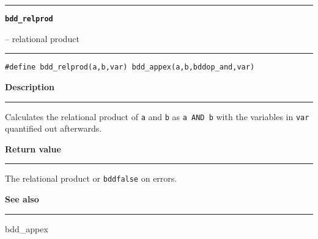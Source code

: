 \begin{minipage}{\textwidth}

\noindent\begin{minipage}{\textwidth}
\rule{\textwidth}{0.5mm}
{\tt\bf bdd\_relprod }
\--- relational product  \hspace{\fill}
\\\rule[1.5ex]{\textwidth}{0.5mm}
\end{minipage}

\noindent\begin{verbatim}
#define bdd_relprod(a,b,var) bdd_appex(a,b,bddop_and,var) 
\end{verbatim}

\vspace{\parsep}\noindent
{\bf Description}\\\rule[1.5ex]{\textwidth}{0.2mm}\vspace{-1.5ex}\setlength{\parindent}{1em}
Calculates the relational product of {\tt a} and {\tt b} as
           {\tt a AND b} with the variables in {\tt var} quantified out
	   afterwards. 

\setlength{\parindent}{0em}\vspace{\parsep}\vspace{\baselineskip}\noindent
{\bf Return value}\\\rule[1.5ex]{\textwidth}{0.2mm}\vspace{-1.5ex}
The relational product or {\tt bddfalse} on errors. 

\vspace{\parsep}\vspace{\baselineskip}\noindent
{\bf See also}\\\rule[1.5ex]{\textwidth}{0.2mm}\vspace{-1.5ex}
bdd\_appex 
\end{minipage}
\vspace{8ex}

